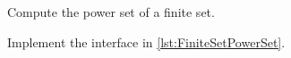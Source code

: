 
\begin{codeexercise}
    Compute the power set of a finite set.

    Implement the interface in \cref{lst:FiniteSetPowerSet}.
\end{codeexercise}



